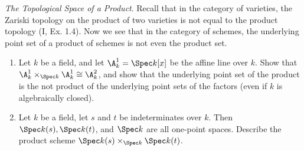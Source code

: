\begin{exercise}%
	\textit{The Topological Space of a Product}. Recall that in the category of varieties, the Zariski topology on the product of two varieties is not equal to the product topology (I, Ex. 1.4). Now we see that in the category of schemes, the underlying point set of a product of schemes is not even the product set.
	\begin{enumerate}
		\item Let $k $ be a field, and let $\A^1_k = \Spec k[x] $ be the affine line over $k $. Show that $\A^1_k \times_{\Spec k} \A_k^1 \cong \A_k^2$, and show that the underlying point set of the product is the not product of the underlying point sets of the factors (even if $k$ is algebraically closed).
		\item Let $k$ be a field, let $s$ and $t$ be indeterminates over $k$. Then $\Spec k(s), \Spec k(t)$, and $\Spec k$ are all one-point spaces. Describe the product scheme $\Spec k(s) \times _{\Spec k} \Spec k(t)$.
	\end{enumerate}
\end{exercise}
